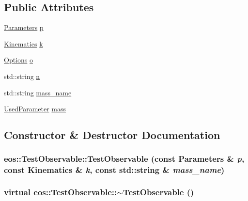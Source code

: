 \subsection*{Public Attributes}
\begin{DoxyCompactItemize}
\item 
\hyperlink{classeos_1_1Parameters}{Parameters} \hyperlink{structeos_1_1TestObservable_ab06f6f24a04051ec2a8ebaa5d78ee953}{p}
\item 
\hyperlink{classeos_1_1Kinematics}{Kinematics} \hyperlink{structeos_1_1TestObservable_a58ef1eee27197c2bce21b2e576411a74}{k}
\item 
\hyperlink{classeos_1_1Options}{Options} \hyperlink{structeos_1_1TestObservable_af9d523ad792f2ce3afa336f09d9226a6}{o}
\item 
std::string \hyperlink{structeos_1_1TestObservable_aad5736b5692f43ccae60087154fd2132}{n}
\item 
std::string \hyperlink{structeos_1_1TestObservable_afa242c890fb7299876f30e8d01e218fc}{mass\_\-name}
\item 
\hyperlink{classeos_1_1UsedParameter}{UsedParameter} \hyperlink{structeos_1_1TestObservable_a131b40b285edbecfd177becbbf66b601}{mass}
\end{DoxyCompactItemize}


\subsection{Constructor \& Destructor Documentation}
\hypertarget{structeos_1_1TestObservable_af44302acc1d97376ea453c133cf08c02}{
\subsubsection[{TestObservable}]{\setlength{\rightskip}{0pt plus 5cm}eos::TestObservable::TestObservable (const {\bf Parameters} \& {\em p}, \/  const {\bf Kinematics} \& {\em k}, \/  const std::string \& {\em mass\_\-name})}}
\label{structeos_1_1TestObservable_af44302acc1d97376ea453c133cf08c02}
\hypertarget{structeos_1_1TestObservable_a1462125ba005e855c9127da2ce8c7f15}{
\subsubsection[{$\sim$TestObservable}]{\setlength{\rightskip}{0pt plus 5cm}virtual eos::TestObservable::$\sim$TestObservable ()}}
\label{structeos_1_1TestObservable_a1462125ba005e855c9127da2ce8c7f15}



